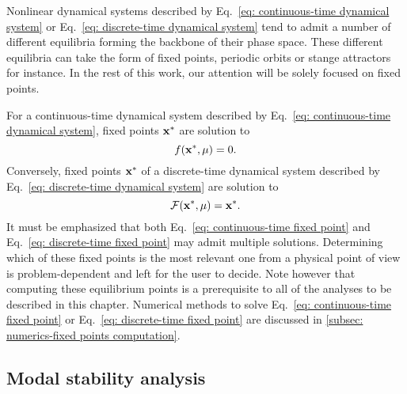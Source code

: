   Nonlinear dynamical systems described by Eq.~\eqref{eq: continuous-time dynamical system} or Eq.~\eqref{eq: discrete-time dynamical system} tend to admit a number of different equilibria forming the backbone of their phase space. These different equilibria can take the form of fixed points, periodic orbits or stange attractors for instance. In the rest of this work, our attention will be solely focused on fixed points.

  For a continuous-time dynamical system described by Eq.~\eqref{eq: continuous-time dynamical system}, fixed points ${\bf x}^{*}$ are solution to
  \begin{equation}
    f({\bf x}^*, \mu) = 0.
    \label{eq: continuous-time fixed point}
  \end{equation}
  Conversely, fixed points ${\bf x}^*$ of a discrete-time dynamical system described by Eq.~\eqref{eq: discrete-time dynamical system} are solution to
  \begin{equation}
    \mathcal{F}({\bf x}^*, \mu) = {\bf x}^*.
    \label{eq: discrete-time fixed point}
  \end{equation}
  It must be emphasized that both Eq.~\eqref{eq: continuous-time fixed point} and Eq.~\eqref{eq: discrete-time fixed point} may admit multiple solutions. Determining which of these fixed points is the most relevant one from a physical point of view is problem-dependent and left for the user to decide. Note however that computing these equilibrium points is a prerequisite to all of the analyses to be described in this chapter. Numerical methods to solve Eq.~\eqref{eq: continuous-time fixed point} or Eq.~\eqref{eq: discrete-time fixed point} are discussed in \textsection \ref{subsec: numerics-fixed points computation}.


  \subsection{Modal stability analysis}
  \label{subsec: theory-modal stability}





